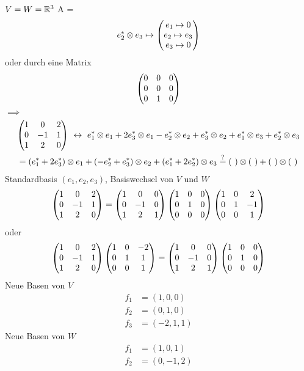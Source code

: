 \begin{Bsp}
  $V=W=\mathbb{R}^3$
  A = \[e_2^*\otimes e_3\mapsto \begin{pmatrix}e_1\mapsto 0 \\ e_2\mapsto e_3\\e_3\mapsto 0\end{pmatrix}\]
  oder durch eine Matrix
  \[\begin{pmatrix}0&0&0\\0&0&0\\0&1&0\end{pmatrix}\]
  $\implies$
  \begin{gather*}
    \Mx{1&0&2\\0&-1&1\\1&2&0}\ \lra\ e_1^*\otimes e_1+2e_3^*\otimes e_1-e_2^*\otimes e_2+e_3^*\otimes e_2+e_1^*\otimes e_3+e_2^*\otimes e_3\\
    =\left( e_1^*+2e_3^* \right)\otimes e_1+\left( -e_2^*+e_3^* \right)\otimes e_2+\left( e_1^*+2e_2^* \right)\otimes e_3 \stackrel{?}{=} \left( \  \right)\otimes \left( \  \right)+\left( \  \right)\otimes \left( \ \right)
  \end{gather*}
  Standardbasis $(e_1,e_2,e_3)$, Basiswechsel von $V$ und $W$
  \begin{gather*}
    \begin{pmatrix}1&0&2\\0&-1&1\\1&2&0\end{pmatrix} = \begin{pmatrix}1&0&0\\0&-1&0\\1&2&1\end{pmatrix}\begin{pmatrix}1&0&0\\0&1&0\\0&0&0\end{pmatrix}\begin{pmatrix}1&0&2\\0&1&-1\\0&0&1\end{pmatrix}
  \end{gather*}
  oder
  \begin{gather*}
    \begin{pmatrix}1&0&2\\0&-1&1\\1&2&0\end{pmatrix}\begin{pmatrix}1&0&-2\\0&1&1\\0&0&1\end{pmatrix}=\begin{pmatrix}1&0&0\\0&-1&0\\1&2&1\end{pmatrix}\begin{pmatrix}1&0&0\\0&1&0\\0&0&0\end{pmatrix}
  \end{gather*}
  Neue Basen von $V$
  \begin{align*}
    f_1&=\left( 1,0,0 \right)\\
    f_2&=\left( 0,1,0 \right)\\
    f_3&=\left( -2,1,1 \right)
  \end{align*}
  Neue Basen von $W$
  \begin{align*}
    f_1&=\left( 1,0,1 \right)\\
    f_2&=\left( 0,-1,2 \right)\\

\end{align*}
\end{Bsp}
